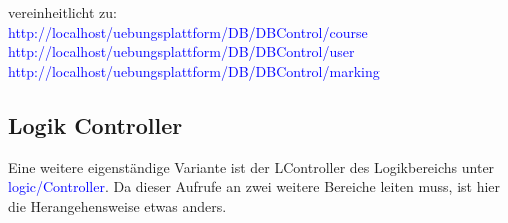 \documentclass[10pt,a4paper,final,parskip]{scrartcl}
\newcommand{\blau}[1]{\textcolor{blue}{#1}}
\begin{document}
vereinheitlicht zu:\\
\blau{http://localhost/uebungsplattform/DB/DBControl/course}\\
\blau{http://localhost/uebungsplattform/DB/DBControl/user}\\
\blau{http://localhost/uebungsplattform/DB/DBControl/marking}\\

\subsection{Logik Controller}
Eine weitere eigenständige Variante ist der LController des Logikbereichs unter \blau{logic/Controller}. Da dieser Aufrufe an zwei weitere Bereiche leiten muss, ist hier die Herangehensweise etwas anders.


\end{document}
